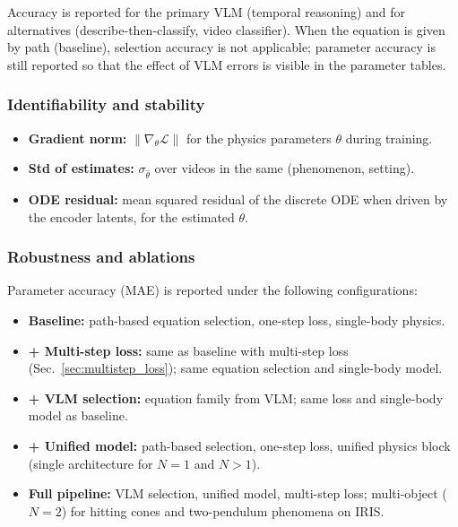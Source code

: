 Accuracy is reported for the primary VLM (temporal reasoning) and for alternatives (describe-then-classify, video classifier). When the equation is given by path (baseline), selection accuracy is not applicable; parameter accuracy is still reported so that the effect of VLM errors is visible in the parameter tables.

\subsubsection{Identifiability and stability}
\label{sec:metrics_id}

\begin{itemize}[noitemsep]
  \item \textbf{Gradient norm:} $\bigl\| \nabla_{\theta} \mathcal{L} \bigr\|$ for the physics parameters $\theta$ during training.
  \item \textbf{Std of estimates:} $\sigma_{\hat{\theta}}$ over videos in the same (phenomenon, setting).
  \item \textbf{ODE residual:} mean squared residual of the discrete ODE when driven by the encoder latents, for the estimated $\theta$.
\end{itemize}

\subsubsection{Robustness and ablations}
\label{sec:metrics_robust}

Parameter accuracy (MAE) is reported under the following configurations:

\begin{itemize}[noitemsep]
  \item \textbf{Baseline:} path-based equation selection, one-step loss, single-body physics.
  \item \textbf{+ Multi-step loss:} same as baseline with multi-step loss (Sec.~\ref{sec:multistep_loss}); same equation selection and single-body model.
  \item \textbf{+ VLM selection:} equation family from VLM; same loss and single-body model as baseline.
  \item \textbf{+ Unified model:} path-based selection, one-step loss, unified physics block (single architecture for $N=1$ and $N>1$).
  \item \textbf{Full pipeline:} VLM selection, unified model, multi-step loss; multi-object ($N=2$) for hitting cones and two-pendulum phenomena on IRIS.
\end{itemize}

